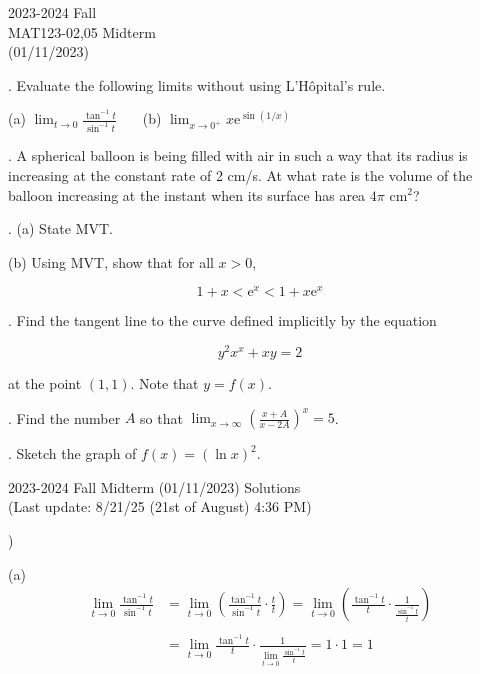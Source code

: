 \documentclass{article}
\begin{document}
\pagestyle{empty}
\large

\begin{center}
2023-2024 Fall \\MAT123-02,05 Midterm\\(01/11/2023)
\end{center}

. Evaluate the following limits without using L'Hôpital's rule.

\hfill

(a) $\displaystyle \lim_{t\to 0} \frac{\tan^{-1} t}{\sin^{-1} t}$ \ \ \ (b) $\displaystyle \lim_{x\to 0^+} x\mathrm{e}^{\displaystyle \sin(1/x)}$

\hfill

. A spherical balloon is being filled with air in such a way that its radius is increasing at the constant rate of 2 cm/s. At what rate is the volume of the balloon increasing at the instant when its surface has area $4\pi$ cm$^2$?

\hfill

. (a) State MVT.

\hfill

\noindent (b) Using MVT, show that for all $x>0$,

\[
1+x < \mathrm{e}^x < 1+x\mathrm{e}^x
\]

\hfill

. Find the tangent line to the curve defined implicitly by the equation

\[
y^2x^x + xy = 2
\]

\hfill

\noindent at the point $(1,1)$. Note that $y=f(x)$.

\hfill

. Find the number $A$ so that $\displaystyle \lim_{x \to \infty} \left(\frac{x+A}{x-2A}\right)^{x}= 5$.

\hfill

. Sketch the graph of $\displaystyle f(x) = (\ln x)^2$.

\newpage

\begin{center}
2023-2024 Fall Midterm (01/11/2023) Solutions\\
(Last update: 8/21/25 (21st of August) 4:36 PM)
\end{center}

)

\hfill

\noindent (a)
\begin{align*}
\lim_{t\to 0} \frac{\tan^{-1} t}{\sin^{-1} t}&= \lim_{t\to 0}\left( \frac{\tan^{-1} t}{\sin^{-1}t} \cdot\frac tt\right) = \lim_{t\to 0}\left( \frac{\tan^{-1} t}{t} \cdot\frac1{\frac {\sin^{-1}t}t}\right)\\\\&=\lim_{t\to0}\frac{\tan^{-1}t}t\cdot\frac1{\displaystyle\lim_{t\to 0}\frac{\sin^{-1}t}t}=1\cdot1=\boxed1
\end{align*}
\end{document}
